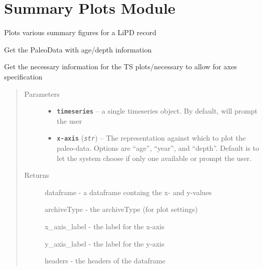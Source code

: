 \documentclass[letterpaper,10pt,english]{sphinxmanual}
\begin{document}
\chapter{Summary Plots Module}
\label{SummaryPlots::doc}\label{SummaryPlots:summary-plots-module}

\begin{fulllineitems}
\label{SummaryPlots:pyleoclim.SummaryPlots}
Plots various summary figures for a LiPD record

\begin{fulllineitems}
\label{SummaryPlots:pyleoclim.SummaryPlots.TsData}
Get the PaleoData with age/depth information

Get the necessary information for the TS plots/necessary to allow for
axes specification
\begin{quote}\begin{description}
\item[{Parameters}] \leavevmode\begin{itemize}
\item {} 
\textbf{\texttt{timeseries}} -- a single timeseries object.
By default, will prompt the user

\item {} 
\textbf{\texttt{x-axis}} (\emph{\texttt{str}}) -- The representation against which to plot the
paleo-data. Options are ``age'', ``year'', and ``depth''.
Default is to let the system choose if only one available
or prompt the user.

\end{itemize}

\item[{Returns}] \leavevmode

dataframe - a dataframe containg the x- and y-values

archiveType - the archiveType (for plot settings)

x\_axis\_label - the label for the x-axis

y\_axis\_label - the label for the y-axis

headers - the headers of the dataframe


\end{description}\end{quote}


\end{fulllineitems}
\end{fulllineitems}
\end{document}
